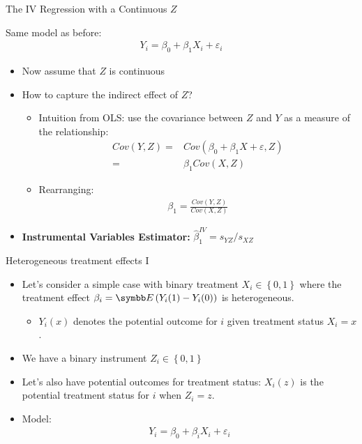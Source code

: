 \documentclass[aspectratio=169,11pt]{beamer}
\begin{document}
\begin{frame}{The IV  Regression with a Continuous $Z$}

Same model as before:
\begin{align*}
	Y_i = \beta_0 + \beta_1 X_i + \varepsilon_i
\end{align*}



\begin{itemize}
	\item Now assume that $Z$ is continuous
	\item How to capture the indirect effect of $Z$?
		\begin{itemize}
			\item Intuition from OLS: use the covariance between $Z$ and $Y$ as a measure of the relationship:
	\begin{align*}
	Cov(Y,Z) =& Cov(\beta_0 + \beta_1 X + \varepsilon,Z)\\
			 =& \beta_1 Cov(X,Z)
	\end{align*}
			\item Rearranging:
				\begin{align*}
					\beta_1= \frac{Cov(Y,Z)}{Cov(X,Z)}
				\end{align*}
		\end{itemize}
	\item {\bf Instrumental Variables Estimator:} $\hat\beta^{IV}_1 = s_{YZ}/ s_{XZ}$

\end{itemize}
\end{frame}


\begin{frame}{Heterogeneous treatment effects I}
\begin{itemize}
\item Let's consider a simple case with binary treatment $X_i \in \left\{0,1\right\}$ where 
the treatment effect $\beta_i=\E\left(Y_{i}(1) - Y_{i}(0)\right)$ is heterogeneous.
\begin{itemize}
	\item $Y_{i}(x)$ denotes the potential outcome for $i$ given treatment status $X_i = x$.
\end{itemize}

\medskip
\item We have a binary instrument $Z_i \in \left\{0,1\right\}$

\medskip
\item Let's also have potential outcomes for treatment status: $X_{i}(z)$ is the potential
	treatment status for $i$ when $Z_i = z$. 

\medskip
\item Model:
\begin{align*}
	Y_i = \beta_0 + \beta_i X_i + \varepsilon_i
\end{align*}
\end{itemize}
\end{frame}
\end{document}
